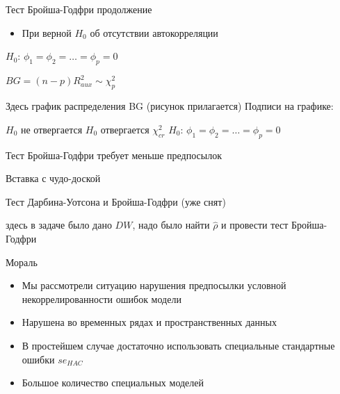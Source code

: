 \documentclass[ignorenonframetext,]{beamer}
\begin{document}
\begin{frame}{Тест Бройша-Годфри продолжение}

\begin{itemize}
\itemsep1pt\parskip0pt
\item
  При верной $H_0$ об отсутствии автокорреляции
\end{itemize}

$H_0$: $\phi_1=\phi_2=\ldots=\phi_p=0$

$BG=(n-p)R^2_{aux} \sim \chi^2_p$

Здесь график распределения BG (рисунок прилагается) Подписи на графике:

$H_0$ не отвергается $H_0$ отвергается $\chi^2_{cr}$ $H_0$:
$\phi_1=\phi_2=\ldots=\phi_p=0$

\end{frame}

\begin{frame}{Тест Бройша-Годфри требует меньше предпосылок}

\end{frame}

\begin{frame}{Вставка с чудо-доской}

Тест Дарбина-Уотсона и Бройша-Годфри (уже снят)

здесь в задаче было дано $DW$, надо было найти $\hat{\rho}$ и провести
тест Бройша-Годфри

\end{frame}

\begin{frame}{Мораль}

\begin{itemize}
\item
  Мы рассмотрели ситуацию нарушения предпосылки условной
  некоррелированности ошибок модели
\item
  Нарушена во временных рядах и пространственных данных
\item
  В простейшем случае достаточно использовать специальные стандартные
  ошибки $se_{HAC}$
\item
  Большое количество специальных моделей
\end{itemize}

\end{frame}
\end{document}
